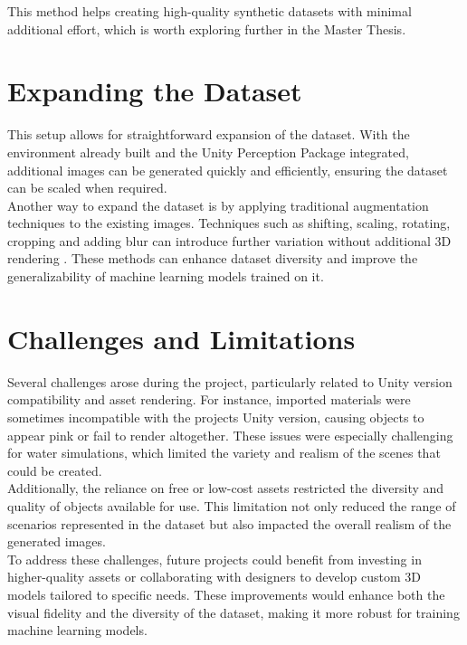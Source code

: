 \noindent This method helps creating high-quality synthetic datasets with minimal additional effort, which is worth exploring further in the Master Thesis.


\section{Expanding the Dataset}
This setup allows for straightforward expansion of the dataset. With the environment already built and the Unity Perception Package \cite{unity-perception2022} integrated, additional images can be generated quickly and efficiently, ensuring the dataset can be scaled when required. \\

\noindent Another way to expand the dataset is by applying traditional augmentation techniques to the existing images. Techniques such as shifting, scaling, rotating, cropping and adding blur can introduce further variation without additional 3D rendering \cite{nikolenko2021synthetic}. These methods can enhance dataset diversity and improve the generalizability of machine learning models trained on it.


\section{Challenges and Limitations}
Several challenges arose during the project, particularly related to Unity version compatibility and asset rendering. For instance, imported materials were sometimes incompatible with the projects Unity version, causing objects to appear pink or fail to render altogether. These issues were especially challenging for water simulations, which limited the variety and realism of the scenes that could be created.\\

\noindent Additionally, the reliance on free or low-cost assets restricted the diversity and quality of objects available for use. This limitation not only reduced the range of scenarios represented in the dataset but also impacted the overall realism of the generated images.\\

\noindent To address these challenges, future projects could benefit from investing in higher-quality assets or collaborating with designers to develop custom 3D models tailored to specific needs. These improvements would enhance both the visual fidelity and the diversity of the dataset, making it more robust for training machine learning models.



